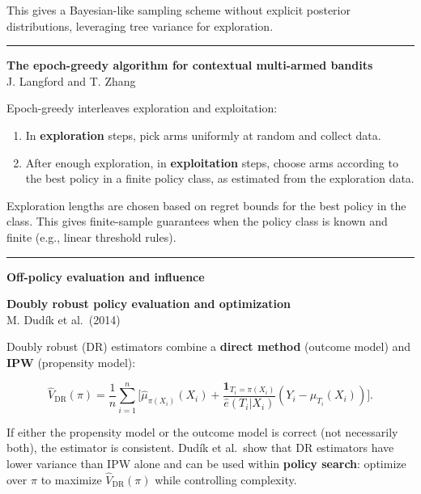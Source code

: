 \documentclass[a5paper]{article}
\providecommand{\tightlist}{%
  \setlength{\itemsep}{0pt}\setlength{\parskip}{0pt}}
\def\subsection#1{{\par\bigskip\goodbreak\large\bfseries #1\par}}
\begin{document}
This gives a Bayesian-like sampling scheme without explicit posterior
distributions, leveraging tree variance for exploration.

\begin{center}\rule{0.5\linewidth}{0.5pt}\end{center}

\textbf{The epoch-greedy algorithm for contextual multi-armed bandits}\\
J. Langford and T. Zhang

Epoch-greedy interleaves exploration and exploitation:

\begin{enumerate}
\def\labelenumi{\arabic{enumi}.}
\tightlist
\item
  In \textbf{exploration} steps, pick arms uniformly at random and
  collect data.
\item
  After enough exploration, in \textbf{exploitation} steps, choose arms
  according to the best policy in a finite policy class, as estimated
  from the exploration data.
\end{enumerate}

Exploration lengths are chosen based on regret bounds for the best
policy in the class. This gives finite-sample guarantees when the policy
class is known and finite (e.g., linear threshold rules).

\begin{center}\rule{0.5\linewidth}{0.5pt}\end{center}

\subsection{Off-policy evaluation and
influence}\label{off-policy-evaluation-and-influence}

\textbf{Doubly robust policy evaluation and optimization}\\
M. Dudík et al.~(2014)

Doubly robust (DR) estimators combine a \textbf{direct method} (outcome
model) and \textbf{IPW} (propensity model):

\[ \hat V_\mathrm{DR}(\pi) = \frac1n\sum_{i=1}^n \bigl[
\hat\mu_{\pi(X_i)}(X_i) +
\frac{\mathbf{1}_{T_i=\pi(X_i)}}{\hat e(T_i|X_i)} (Y_i - \hat\mu_{T_i}(X_i))
\bigr]. \]

If either the propensity model or the outcome model is correct (not
necessarily both), the estimator is consistent. Dudík et al.~show that
DR estimators have lower variance than IPW alone and can be used within
\textbf{policy search}: optimize over $\pi$ to maximize
$\hat V_\mathrm{DR}(\pi)$ while controlling complexity.
\end{document}
